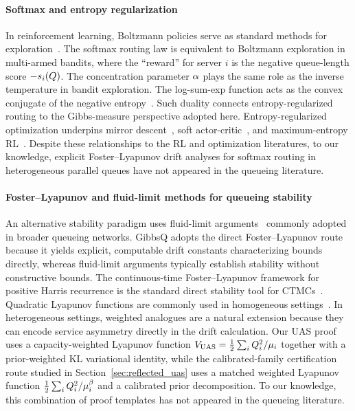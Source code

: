 \paragraph{Softmax and entropy regularization}
In reinforcement learning, Boltzmann policies serve as standard methods for exploration~\cite{sutton2018reinforcement}. The softmax routing law is equivalent to Boltzmann exploration in multi-armed bandits, where the ``reward'' for server $i$ is the negative queue-length score $-s_i(Q)$. The concentration parameter $\alpha$ plays the same role as the inverse temperature in bandit exploration.
The log-sum-exp function acts as the convex conjugate of the negative entropy~\cite{boyd2004convex}.
Such duality connects entropy-regularized routing to the Gibbs-measure perspective adopted here.
Entropy-regularized optimization underpins mirror descent~\cite{nemirovskij1983problem,beck2003mirror}, soft actor-critic~\cite{haarnoja2018soft}, and maximum-entropy RL~\cite{ziebart2010modeling}.
Despite these relationships to the RL and optimization literatures, to our knowledge, explicit Foster--Lyapunov drift analyses for softmax routing in heterogeneous parallel queues have not appeared in the queueing literature.

\paragraph{Foster--Lyapunov and fluid-limit methods for queueing stability}
An alternative stability paradigm uses fluid-limit arguments~\cite{dai1995fluid} commonly adopted in broader queueing networks. GibbsQ adopts the direct Foster--Lyapunov route because it yields explicit, computable drift constants characterizing bounds directly, whereas fluid-limit arguments typically establish stability without constructive bounds. The continuous-time Foster--Lyapunov framework for positive Harris recurrence is the standard direct stability tool for CTMCs~\cite{meyn2009markov}.
Quadratic Lyapunov functions are commonly used in homogeneous settings~\cite{neely2010stochastic}. In heterogeneous settings, weighted analogues are a natural extension because they can encode service asymmetry directly in the drift calculation.
Our UAS proof uses a capacity-weighted Lyapunov function $V_{\mathrm{UAS}} = \frac{1}{2}\sum_i Q_{i}^2/\mu_i$ together with a prior-weighted KL variational identity, while the calibrated-family certification route studied in Section~\ref{sec:reflected_uas} uses a matched weighted Lyapunov function $\frac{1}{2}\sum_i Q_{i}^2/\mu_i^{\beta}$ and a calibrated prior decomposition. To our knowledge, this combination of proof templates has not appeared in the queueing literature.

